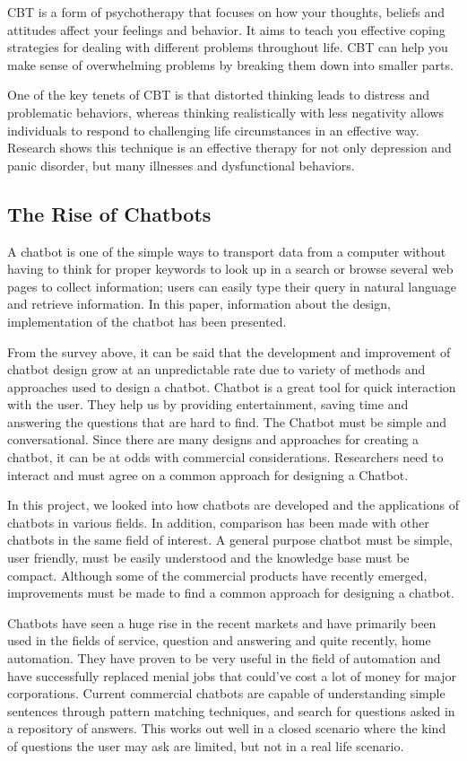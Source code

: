 \documentclass[conference,compsoc]{IEEEtran}
\begin{document}
CBT is a form of psychotherapy that focuses on how your thoughts, beliefs and attitudes affect your feelings and behavior. It aims to teach you effective coping strategies for dealing with different problems throughout life. CBT can help you make sense of overwhelming problems by breaking them down into smaller parts.

One of the key tenets of CBT is that distorted thinking leads to distress and problematic behaviors, whereas thinking realistically with less negativity allows individuals to respond to challenging life circumstances in an effective way. Research shows this technique is an effective therapy for not only depression and panic disorder, but many illnesses and dysfunctional behaviors.

\subsection{The Rise of Chatbots}

A chatbot is one of the simple ways to transport data from a computer without having to think for proper keywords to look up in a search or browse several web pages to collect information; users can easily type their query in natural language and retrieve information. In this paper, information about the design, implementation of the chatbot has been presented.

From the survey above, it can be said that the development and improvement of chatbot design grow at an unpredictable rate due to variety of methods and approaches used to design a chatbot. Chatbot is a great tool for quick interaction with the user. They help us by providing entertainment, saving time and answering the questions that are hard to find. The Chatbot must be simple and conversational. Since there are many designs and approaches for creating a chatbot, it can be at odds with commercial considerations. Researchers need to interact and must agree on a common approach for designing a Chatbot.

In this project, we looked into how chatbots are developed and the applications of chatbots in various fields. In addition, comparison has been made with other chatbots in the same field of interest. A general purpose chatbot must be simple, user friendly, must be easily understood and the knowledge base must be compact. Although some of the commercial products have recently emerged, improvements must be made to find a common approach for designing a chatbot.

Chatbots have seen a huge rise in the recent markets and have primarily been used in the fields of service, question and answering and quite recently, home automation. They have proven to be very useful in the field of automation and have successfully replaced menial jobs that could’ve cost a lot of money for major corporations. Current commercial chatbots are capable of understanding simple sentences through pattern matching techniques, and search for questions asked in a repository of answers. This works out well in a closed scenario where the kind of questions the user may ask are limited, but not in a real life scenario.
\end{document}
